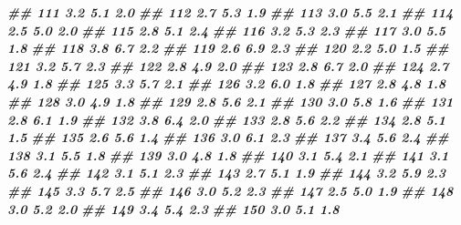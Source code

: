 \documentclass[
]{book}
\newenvironment{Shaded}{\begin{snugshade}}{\end{snugshade}}
\newcommand{\DocumentationTok}[1]{\textcolor[rgb]{0.56,0.35,0.01}{\textbf{\textit{#1}}}}
\begin{document}
\begin{Shaded}
\begin{Highlighting}[]
\DocumentationTok{\#\# 111         3.2          5.1         2.0}
\DocumentationTok{\#\# 112         2.7          5.3         1.9}
\DocumentationTok{\#\# 113         3.0          5.5         2.1}
\DocumentationTok{\#\# 114         2.5          5.0         2.0}
\DocumentationTok{\#\# 115         2.8          5.1         2.4}
\DocumentationTok{\#\# 116         3.2          5.3         2.3}
\DocumentationTok{\#\# 117         3.0          5.5         1.8}
\DocumentationTok{\#\# 118         3.8          6.7         2.2}
\DocumentationTok{\#\# 119         2.6          6.9         2.3}
\DocumentationTok{\#\# 120         2.2          5.0         1.5}
\DocumentationTok{\#\# 121         3.2          5.7         2.3}
\DocumentationTok{\#\# 122         2.8          4.9         2.0}
\DocumentationTok{\#\# 123         2.8          6.7         2.0}
\DocumentationTok{\#\# 124         2.7          4.9         1.8}
\DocumentationTok{\#\# 125         3.3          5.7         2.1}
\DocumentationTok{\#\# 126         3.2          6.0         1.8}
\DocumentationTok{\#\# 127         2.8          4.8         1.8}
\DocumentationTok{\#\# 128         3.0          4.9         1.8}
\DocumentationTok{\#\# 129         2.8          5.6         2.1}
\DocumentationTok{\#\# 130         3.0          5.8         1.6}
\DocumentationTok{\#\# 131         2.8          6.1         1.9}
\DocumentationTok{\#\# 132         3.8          6.4         2.0}
\DocumentationTok{\#\# 133         2.8          5.6         2.2}
\DocumentationTok{\#\# 134         2.8          5.1         1.5}
\DocumentationTok{\#\# 135         2.6          5.6         1.4}
\DocumentationTok{\#\# 136         3.0          6.1         2.3}
\DocumentationTok{\#\# 137         3.4          5.6         2.4}
\DocumentationTok{\#\# 138         3.1          5.5         1.8}
\DocumentationTok{\#\# 139         3.0          4.8         1.8}
\DocumentationTok{\#\# 140         3.1          5.4         2.1}
\DocumentationTok{\#\# 141         3.1          5.6         2.4}
\DocumentationTok{\#\# 142         3.1          5.1         2.3}
\DocumentationTok{\#\# 143         2.7          5.1         1.9}
\DocumentationTok{\#\# 144         3.2          5.9         2.3}
\DocumentationTok{\#\# 145         3.3          5.7         2.5}
\DocumentationTok{\#\# 146         3.0          5.2         2.3}
\DocumentationTok{\#\# 147         2.5          5.0         1.9}
\DocumentationTok{\#\# 148         3.0          5.2         2.0}
\DocumentationTok{\#\# 149         3.4          5.4         2.3}
\DocumentationTok{\#\# 150         3.0          5.1         1.8}
\end{Highlighting}
\end{Shaded}
\end{document}
